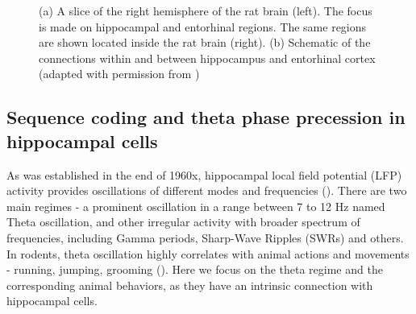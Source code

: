 \begin{figure}
\captionsetup{format=plain}
\caption[Hippocampal-entorhinal Anatomy]{
(a) A slice of the right hemisphere of the rat brain (left). The focus is made on hippocampal and entorhinal regions. The same regions are shown located inside the rat brain (right). (b) Schematic of the connections within and between hippocampus and entorhinal cortex (adapted with permission from \cite{Moser2014})
}
\label{fig:F2_HPC_anatomy}
\end{figure}


\subsection{Sequence coding and theta phase precession in hippocampal cells}

As was established in the end of 1960x, hippocampal local field potential (LFP) activity provides oscillations of different modes and frequencies (\cite{Vanderwolf1969}). There are two main regimes - a prominent oscillation in a range between 7 to 12 Hz named Theta oscillation, and other irregular activity with broader spectrum of frequencies, including Gamma periods, Sharp-Wave Ripples (SWRs) and others. In rodents, theta oscillation highly correlates with animal actions and movements - running, jumping, grooming (\cite{OKeefe1993}). Here we focus on the theta regime and the corresponding animal behaviors, as they have an intrinsic connection with hippocampal cells.

